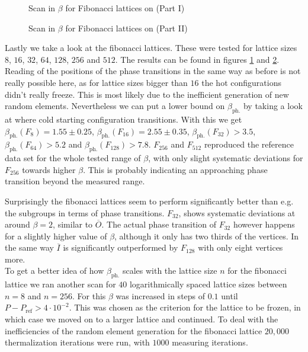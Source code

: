 \begin{figure}[!hbt]
 \centering
 
 \caption{Scan in $\beta$ for Fibonacci lattices on \SUTwo (Part I)}
 \label{plot:fibonacciI}
\end{figure}
\begin{figure}[!hbt]
 \centering
 
 \caption{Scan in $\beta$ for Fibonacci lattices on \SUTwo (Part II)}
 \label{plot:fibonacciII}
\end{figure}

Lastly we take a look at the fibonacci lattices. These were tested for lattice sizes  $8$, $16$, $32$, $64$, $128$, $256$ and $512$. The results can be found in figures \ref{plot:fibonacciI} and \ref{plot:fibonacciII}. Reading of the positions of the phase transitions in the same way as before is not really possible here, as for lattice sizes bigger than $16$ the hot configurations didn't really freeze. This is most likely due to the inefficient generation of new random elements. Nevertheless we can put a lower bound on $\beta_{\textrm{ph.}}$ by taking a look at where cold starting configuration transitions. With this we get $\beta_{\textrm{ph.}}(F_8) = 1.55 \pm 0.25$, $\beta_{\textrm{ph.}}(F_16) = 2.55 \pm 0.35 $, $\beta_{\textrm{ph.}}(F_{32}) > 3.5 $, $\beta_{\textrm{ph.}}(F_{64}) > 5.2 $ and $\beta_{\textrm{ph.}}(F_{128}) > 7.8$. $F_{256}$ and $F_{512}$ reproduced the reference data set for the whole tested range of $\beta$, with only slight systematic deviations for $F_{256}$ towards higher $\beta$. This is probably indicating an approaching phase transition beyond the measured range.

Surprisingly the fibonacci lattices seem to perform significantly better than e.g. the subgroups in terms of phase transitions. $F_{32}$, shows systematic deviations at around $\beta = 2$, similar to $\overline{O}$. The actual phase transition of $F_{32}$ however happens for a slightly higher value of $\beta$, although it only has two thirds of the vertices. In the same way $\overline{I}$ is significantly outperformed by $F_{128}$ with only eight vertices more. \\

To get a better idea of how $\beta_{\textrm{ph.}}$ scales with the lattice size $n$ for the fibonacci lattice we ran another scan for $40$ logarithmically spaced lattice sizes between $n=8$ and $n=256$. For this $\beta$ was increased in steps of $0.1$ until $P-P_{\textrm{ref}} > 4 \cdot 10^{-2}$. This was chosen as the criterion for the lattice to be frozen, in which case we moved on to a larger lattice and continued. To deal with the inefficiencies of the random element generation for the fibonacci lattice $20,000$ thermalization iterations were run, with $1000$ measuring iterations.

